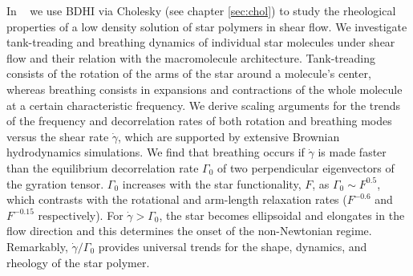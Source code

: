 \documentclass[twoside,openright,titlepage,numbers=noenddot,%
headinclude,footinclude,cleardoublepage=empty,abstract=on,
BCOR=5mm,fontsize=11pt, dvipsnames, paper=b5
]{scrreprt}
\begin{document}
In ~\cite{Pelaez2020} we use \gls{BDHI} via Cholesky (see chapter \ref{sec:chol}) to study the rheological properties of a low density solution of star polymers in shear flow.
We investigate tank-treading and breathing dynamics of individual star molecules under shear flow and their relation with the macromolecule architecture. Tank-treading consists of the rotation of the arms of the star around a molecule’s center, whereas breathing consists in expansions and contractions of the whole molecule at a certain characteristic frequency. We derive scaling arguments for the trends of the frequency and decorrelation rates of both rotation and breathing modes versus the shear rate $\dot{\gamma}$, which are supported by extensive Brownian hydrodynamics simulations. We find that breathing occurs if $\dot{\gamma}$ is made faster than the equilibrium decorrelation rate $\Gamma_0$ of two perpendicular eigenvectors of the gyration tensor. $\Gamma_0$ increases with the star functionality, $F$, as $\Gamma_0 \sim F^{0.5}$, which contrasts with the rotational and arm-length relaxation rates ($F^{-0.6}$ and $F^ {-0.15}$ respectively). For $\dot{\gamma} > \Gamma_0$, the star becomes ellipsoidal and elongates in the flow direction and this determines the onset of the non-Newtonian regime. Remarkably, $\dot{\gamma}/\Gamma_0$ provides universal trends for the shape, dynamics, and rheology of the star polymer.
%
%
\end{document}
